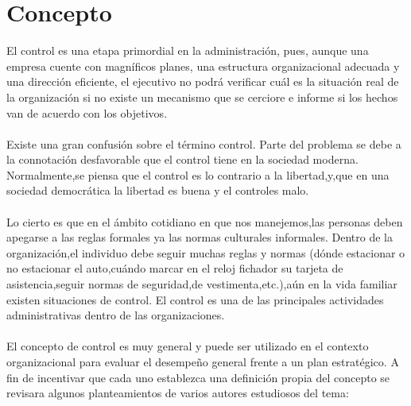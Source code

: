 \documentclass[12pt,letterpaper]{article}
\begin{document}
\section{Concepto}
El control es una etapa primordial en la administración, pues, aunque una empresa cuente con magníficos planes, una estructura organizacional adecuada y una dirección eficiente, el ejecutivo no podrá verificar cuál es la situación real de la organización si no existe un mecanismo que se cerciore e informe si los hechos van de acuerdo con los objetivos.\\${ }$\\
Existe una gran confusión sobre el término control. Parte del problema se
debe a la connotación desfavorable que el control tiene en la sociedad
moderna. Normalmente,se piensa que el control es lo contrario a la
libertad,y,que en una sociedad democrática la libertad es buena y el
controles malo. \\${ }$\\
Lo cierto es que en el ámbito cotidiano en que nos manejemos,las
personas deben apegarse a las reglas formales ya las normas culturales
informales. Dentro de la organización,el individuo debe seguir muchas
reglas y normas (dónde estacionar o no estacionar el auto,cuándo marcar
en el reloj fichador su tarjeta de asistencia,seguir normas de seguridad,de
vestimenta,etc.),aún en la vida familiar existen situaciones de control.
El control es una de las principales actividades administrativas dentro de
las organizaciones. \\${ }$\\
El concepto de control es muy general y puede ser utilizado en el contexto organizacional para evaluar el desempeño general frente a un plan estratégico.
A fin de incentivar que cada uno establezca una definición propia del concepto se revisara algunos planteamientos de varios autores estudiosos del tema:
\end{document}
